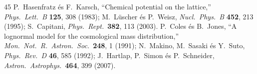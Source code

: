 \documentclass[11pt,a4paper]{article}
\begin{document}
\begin{thebibliography}{45}
 P.~Hasenfratz és F.~Karsch, ``Chemical potential on the lattice,'' \textit{Phys.\ Lett.\ B} \textbf{125}, 308 (1983); M.~L\"uscher és P.~Weisz, \textit{Nucl.\ Phys.\ B} \textbf{452}, 213 (1995); S.~Capitani, \textit{Phys.\ Rept.}\ \textbf{382}, 113 (2003).
 P.~Coles és B.~Jones, ``A lognormal model for the cosmological mass distribution,'' \textit{Mon.\ Not.\ R.\ Astron.\ Soc.}\ \textbf{248}, 1 (1991); N.~Makino, M.~Sasaki és Y.~Suto, \textit{Phys.\ Rev.\ D} \textbf{46}, 585 (1992); J.~Hartlap, P.~Simon és P.~Schneider, \textit{Astron.\ Astrophys.}\ \textbf{464}, 399 (2007).
\end{thebibliography}
\end{document}
